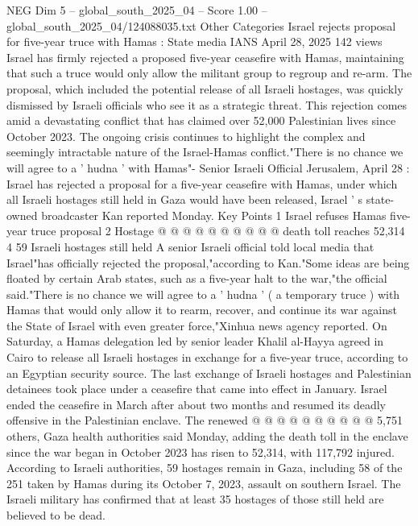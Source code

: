 \begin{textsample}{NEG Dim 5 – global\_south\_2025\_04 – Score 1.00 – global\_south\_2025\_04/124088035.txt}  \label{ex:f5_neg_394}
Other Categories Israel rejects proposal for five-year truce with Hamas : State media IANS April 28, 2025 142 views Israel has firmly rejected a proposed five-year ceasefire with Hamas, maintaining that such a truce would only allow the militant group to regroup and re-arm.
The proposal, which included the potential release of all Israeli hostages, was quickly dismissed by Israeli officials who see it as a strategic threat.
This rejection comes amid a devastating conflict that has claimed over 52,000 Palestinian lives since October 2023.
The ongoing crisis continues to highlight the complex and seemingly intractable nature of the Israel-Hamas conflict."There is no chance we will agree to a ' hudna ' with Hamas"- Senior Israeli Official Jerusalem, April 28 : Israel has rejected a proposal for a five-year ceasefire with Hamas, under which all Israeli hostages still held in Gaza would have been released, Israel ' s state-owned broadcaster Kan reported Monday.
Key Points 1 Israel refuses Hamas five-year truce proposal 2 Hostage @ @ @ @ @ @ @ @ @ @ death toll reaches 52,314 4 59 Israeli hostages still held A senior Israeli official told local media that Israel"has officially rejected the proposal,"according to Kan."Some ideas are being floated by certain Arab states, such as a five-year halt to the war,"the official said."There is no chance we will agree to a ' hudna ' ( a temporary truce ) with Hamas that would only allow it to rearm, recover, and continue its war against the State of Israel with even greater force,"Xinhua news agency reported.
On Saturday, a Hamas delegation led by senior leader Khalil al-Hayya agreed in Cairo to release all Israeli hostages in exchange for a five-year truce, according to an Egyptian security source.
The last exchange of Israeli hostages and Palestinian detainees took place under a ceasefire that came into effect in January.
Israel ended the ceasefire in March after about two months and resumed its deadly offensive in the Palestinian enclave.
The renewed @ @ @ @ @ @ @ @ @ @ 5,751 others, Gaza health authorities said Monday, adding the death toll in the enclave since the war began in October 2023 has risen to 52,314, with 117,792 injured.
According to Israeli authorities, 59 hostages remain in Gaza, including 58 of the 251 taken by Hamas during its October 7, 2023, assault on southern Israel.
The Israeli military has confirmed that at least 35 hostages of those still held are believed to be dead.

\end{textsample}
